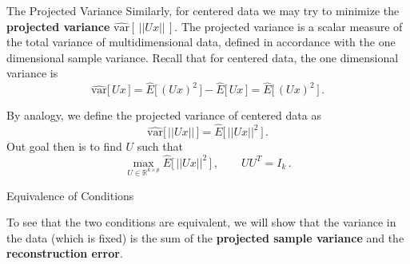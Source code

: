 \documentclass[10pt, table, dvipsnames,xcdraw,handout]{beamer}
\newcommand{\bR}{\ensuremath{\mathbb{R}}}
\def\layersep{2.5cm}
\begin{document}
\begin{frame}[fragile]{The Projected Variance}
Similarly, for centered data we may try to minimize the \textbf{projected variance} $\widehat{\text{var}}[\,||Ux||\,]$. The projected variance is a scalar measure of the total variance of multidimensional data, defined in accordance with the one dimensional sample variance. Recall that for centered data, the one dimensional variance is
$$
\widehat{\text{var}}\big[\,Ux\,\big]  = \widehat{E}\big[\,(Ux)^2\,\big]  -  \widehat{E}\big[\,Ux\,\big] = \widehat{E}\big[\,(Ux)^2\,\big]\,.
$$\pause

By analogy, we define the projected variance of centered data as 
$$
\widehat{\text{var}}\big[\,||Ux||\,\big] = \widehat{E}\big[\,||Ux||^2\,\big] \,.
$$\pause
Out goal then is to find $U$ such that
$$
 \max_{U\in \bR^{k\times p} }\widehat{E}\big[\,||Ux||^2\,\big]\,,\hspace{2em} UU^T = I_k\,.
$$

\end{frame}









\begin{frame}[fragile]{Equivalence of Conditions}
\begin{minipage}[t][0.4\textheight][t]{\textwidth}\centering
{}
  \end{minipage}
  \vfill
\begin{minipage}[t][0.4\textheight][t]{\textwidth}
To see that the two conditions are equivalent, we will show that the variance in the data (which is fixed) is the sum of the \textbf{projected sample variance} and the \textbf{reconstruction error}.
\end{minipage}
\end{frame}
\end{document}
